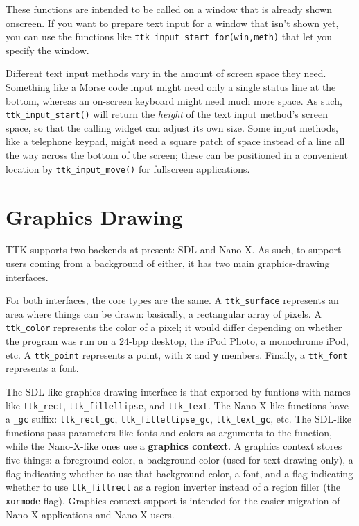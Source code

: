 \documentclass[12pt,letterpaper]{report}
\begin{document}
These functions are intended to be called on a window that is already shown onscreen. If you
want to prepare text input for a window that isn't shown yet, you can use the functions like
\verb|ttk_input_start_for(win,meth)| that let you specify the window.

Different text input methods vary in the amount of screen space they need. Something like a Morse code
input might need only a single status line at the bottom, whereas an on-screen keyboard might need
much more space. As such, \verb|ttk_input_start()| will return the {\em height} of the text input method's
screen space, so that the calling widget can adjust its own size. Some input methods, like a telephone keypad,
might need a square patch of space instead of a line all the way across the bottom of the screen;
these can be positioned in a convenient location by \verb|ttk_input_move()| for fullscreen applications.

\section{Graphics Drawing}
TTK supports two backends at present: SDL and Nano-X. As such, to support users coming from a background
of either, it has two main graphics-drawing interfaces.

For both interfaces, the core types are the same. A \verb|ttk_surface| represents an area where things
can be drawn: basically, a rectangular array of pixels. A \verb|ttk_color| represents the
color of a pixel; it would differ depending on whether the program was run on a 24-bpp desktop, the iPod
Photo, a monochrome iPod, etc. A \verb|ttk_point| represents a point, with \verb|x| and \verb|y| members.
Finally, a \verb|ttk_font| represents a font.

The SDL-like graphics drawing interface is that exported by funtions with names like \verb|ttk_rect|,
\verb|ttk_fillellipse|, and \verb|ttk_text|. The Nano-X-like functions have a \verb|_gc| suffix:
\verb|ttk_rect_gc|, \verb|ttk_fillellipse_gc|, \verb|ttk_text_gc|, etc. The SDL-like functions
pass parameters like fonts and colors as arguments to the function, while the Nano-X-like ones
use a {\bf graphics context}. A graphics context stores five things: a foreground color, a background color
(used for text drawing only), a flag indicating whether to use that background color, a font,
and a flag indicating whether to use \verb|ttk_fillrect| as a region inverter instead of a region filler
(the \verb|xormode| flag). Graphics context support is intended for the easier migration of Nano-X
applications and Nano-X users.
\end{document}
